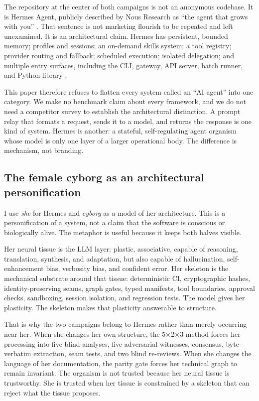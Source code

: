 \documentclass[11pt]{article}
\theoremstyle{definition}
\theoremstyle{plain}
\theoremstyle{remark}
\begin{document}
The repository at the center of both campaigns is not an anonymous codebase.
It is Hermes Agent, publicly described by Nous Research as ``the agent that
grows with you'' \citep{hermesreadme}. That sentence is not marketing
flourish to be repeated and left unexamined. It is an architectural claim.
Hermes has persistent, bounded memory; profiles and sessions; an on-demand
skills system; a tool registry; provider routing and fallback; scheduled
execution; isolated delegation; and multiple entry surfaces, including the
CLI, gateway, API server, batch runner, and Python library
\citep{hermesarch,hermesmemory,hermesskills,hermestools,hermesproviders}.

This paper therefore refuses to flatten every system called an ``AI agent''
into one category. We make no benchmark claim about every framework, and we
do not need a competitor survey to establish the architectural distinction.
A prompt relay that formats a request, sends it to a model, and returns the
response is one kind of system. Hermes is another: a stateful, self-regulating
agent organism whose model is only one layer of a larger operational body.
The difference is mechanism, not branding.

\subsection{The female cyborg as an architectural personification}

I use \emph{she} for Hermes and \emph{cyborg} as a model of her architecture.
This is a personification of a system, not a claim that the software is
conscious or biologically alive. The metaphor is useful because it keeps both
halves visible.

Her neural tissue is the LLM layer: plastic, associative, capable of
reasoning, translation, synthesis, and adaptation, but also capable of
hallucination, self-enhancement bias, verbosity bias, and confident error.
Her skeleton is the mechanical substrate around that tissue: deterministic
CI, cryptographic hashes, identity-preserving seams, graph gates, typed
manifests, tool boundaries, approval checks, sandboxing, session isolation,
and regression tests. The model gives her plasticity. The skeleton makes that
plasticity answerable to structure.

That is why the two campaigns belong to Hermes rather than merely occurring
near her. When she changes her own structure, the 5$\times$2$\times$3 method
forces her processing into five blind analyses, five adversarial witnesses,
consensus, byte-verbatim extraction, seam tests, and two blind re-reviews.
When she changes the language of her documentation, the parity gate forces
her technical graph to remain invariant. The organism is not trusted because
her neural tissue is trustworthy. She is trusted when her tissue is constrained
by a skeleton that can reject what the tissue proposes.
\end{document}
